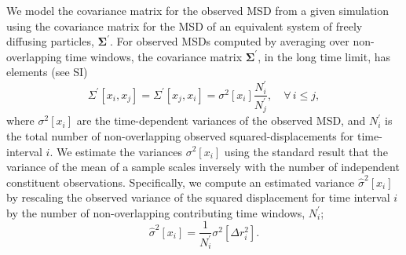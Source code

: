 \documentclass[reprint,superscriptaddress,nobibnotes,amsmath,amssymb,aps,prx,hidelinks]{revtex4-2}
\newcommand{\oMSDi}{\ensuremath{x_i}}
\newcommand{\oMSDj}{\ensuremath{x_j}}
\newcommand{\nind}[1]{\ensuremath{N^\prime_{#1}}}
\newcommand{\var}[1]{\ensuremath{\sigma^2[#1]}}
\newcommand{\varest}[1]{\ensuremath{\widehat{\sigma}^2[#1]}}
\begin{document}
We model the covariance matrix for the observed MSD from a given simulation using the covariance matrix for the MSD of an equivalent system of freely diffusing particles, $\mathbf{\Sigma^\prime}$.
For observed MSDs computed by averaging over non-overlapping time windows, the covariance matrix $\mathbf{\Sigma^\prime}$, in the long time limit, has elements (see SI)
%
\begin{equation}
  \Sigma^\prime\left[\oMSDi, \oMSDj\right]= \Sigma^\prime\left[\oMSDj, \oMSDi\right] =
  \var{\oMSDi} \frac{\nind{i}}{\nind{j}},\hspace{1em} \forall\,i \leq j,
  \label{equ:cvv}
\end{equation} 
%
where $\var{\oMSDi}$ are the time-dependent variances of the observed MSD, and $\nind{i}$ is the total number of non-overlapping observed squared-displacements for time-interval $i$.
We estimate the variances $\var{\oMSDi}$ using the standard result that the variance of the mean of a sample scales inversely with the number of independent constituent observations.
Specifically, we compute an estimated variance $\varest{\oMSDi}$ by rescaling the observed variance of the squared displacement for time interval $i$ by the number of non-overlapping contributing time windows, $\nind{i}$;
%
\begin{equation}
  \varest{\oMSDi} = \frac{1}{\nind{i}}\var{\Delta r_i^2}.
  \label{equ:varestMSD}
\end{equation}
%
\end{document}
